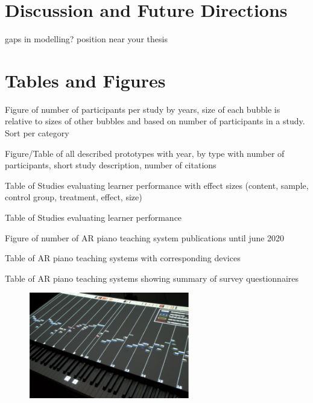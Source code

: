 \documentclass[manuscript,screen]{acmart}
\begin{document}
\section{Discussion and Future Directions}

gaps in modelling? position near your thesis

\section{Tables and Figures}
Figure of number of participants per study by years, size of each bubble is relative to sizes of other bubbles and based on number of participants in a study. Sort per category 

Figure/Table of all described prototypes with year, by type with number of participants, short study description, number of citations

Table of Studies evaluating learner performance with effect sizes (content, sample, control group, treatment, effect, size)

Table of Studies evaluating learner performance 

Figure of number of AR piano teaching system publications until june 2020

Table of AR piano teaching systems with corresponding devices 

Table of AR piano teaching systems showing summary of survey
questionnaires




\begin{figure}
    \centering
    \includegraphics[width=7cm]{figures/piano}
    \caption{\cite{rogers2014piano}}
    \label{fig:rogers2014piano}
\end{figure}
\end{document}
